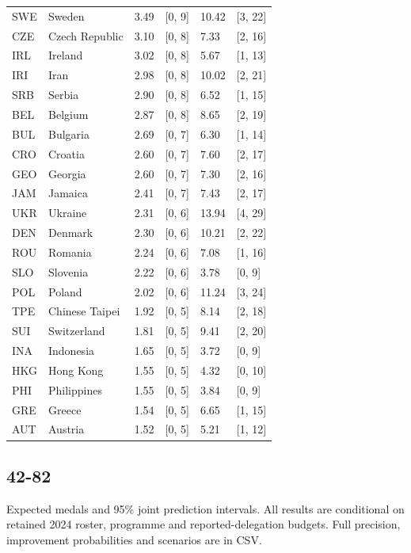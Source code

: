 \documentclass[11pt,a4paper]{article}
\begin{document}
{\begin{longtable}{@{}L{1.098cm} L{4.464cm} R{1.463cm} R{2.195cm} R{1.610cm} R{2.342cm}@{}}
SWE & Sweden & 3.49 & [0, 9] & 10.42 & [3, 22]\\
CZE & Czech Republic & 3.10 & [0, 8] & 7.33 & [2, 16]\\
IRL & Ireland & 3.02 & [0, 8] & 5.67 & [1, 13]\\
IRI & Iran & 2.98 & [0, 8] & 10.02 & [2, 21]\\
SRB & Serbia & 2.90 & [0, 8] & 6.52 & [1, 15]\\
BEL & Belgium & 2.87 & [0, 8] & 8.65 & [2, 19]\\
BUL & Bulgaria & 2.69 & [0, 7] & 6.30 & [1, 14]\\
CRO & Croatia & 2.60 & [0, 7] & 7.60 & [2, 17]\\
GEO & Georgia & 2.60 & [0, 7] & 7.30 & [2, 16]\\
JAM & Jamaica & 2.41 & [0, 7] & 7.43 & [2, 17]\\
UKR & Ukraine & 2.31 & [0, 6] & 13.94 & [4, 29]\\
DEN & Denmark & 2.30 & [0, 6] & 10.21 & [2, 22]\\
ROU & Romania & 2.24 & [0, 6] & 7.08 & [1, 16]\\
SLO & Slovenia & 2.22 & [0, 6] & 3.78 & [0, 9]\\
POL & Poland & 2.02 & [0, 6] & 11.24 & [3, 24]\\
TPE & Chinese Taipei & 1.92 & [0, 5] & 8.14 & [2, 18]\\
SUI & Switzerland & 1.81 & [0, 5] & 9.41 & [2, 20]\\
INA & Indonesia & 1.65 & [0, 5] & 3.72 & [0, 9]\\
HKG & Hong Kong & 1.55 & [0, 5] & 4.32 & [0, 10]\\
PHI & Philippines & 1.55 & [0, 5] & 3.84 & [0, 9]\\
GRE & Greece & 1.54 & [0, 5] & 6.65 & [1, 15]\\
AUT & Austria & 1.52 & [0, 5] & 5.21 & [1, 12]\\
\bottomrule
\end{longtable}}
\par{}
\clearpage
\subsection*{42-82}
Expected medals and 95\% joint prediction intervals. All results are conditional on retained 2024 roster, programme and reported-delegation budgets. Full precision, improvement probabilities and scenarios are in CSV.
\end{document}
